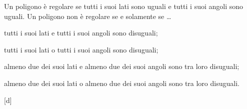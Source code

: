 

\begin{esercizio}
\label{ese:1.133}
Un poligono è regolare se tutti i suoi lati sono uguali e tutti i 
suoi angoli sono uguali. Un poligono non è regolare se e solamente se 
\ldots
\begin{enumeratea}
\item tutti i suoi lati e tutti i suoi angoli sono disuguali;
\item tutti i suoi lati o tutti i suoi angoli sono disuguali;
\item almeno due dei suoi lati e almeno due dei suoi angoli sono tra 
loro disuguali;
\item almeno due dei suoi lati o almeno due dei suoi angoli sono tra 
loro disuguali.
\end{enumeratea}
\vspace{-2.3em}
\hfill[d]
\end{esercizio}
